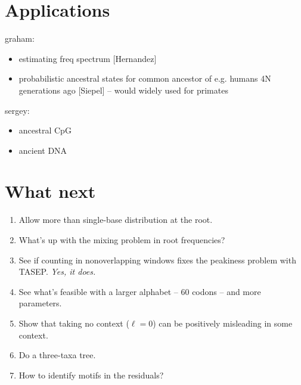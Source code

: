 \documentclass{article}
\theoremstyle{plain}
\theoremstyle{definition}
\begin{document}
\section{Applications}

graham:
\begin{itemize}

\item estimating freq spectrum [Hernandez]

\item probabilistic ancestral states for common ancestor of e.g. humans 4N generations ago [Siepel] -- would widely used for primates

\end{itemize}


sergey:
\begin{itemize}

  \item ancestral CpG

  \item ancient DNA

\end{itemize}


\section{What next}

\begin{enumerate}

  \item Allow more than single-base distribution at the root.

  \item What's up with the mixing problem in root frequencies?

  \item See if counting in nonoverlapping windows fixes the peakiness problem with TASEP. \emph{Yes, it does.}

  \item See what's feasible with a larger alphabet -- 60 codons -- and more parameters.

  \item Show that taking no context ($\ell=0$) can be positively misleading in some context.

  \item Do a three-taxa tree.

  \item How to identify motifs in the residuals?

\end{enumerate}
\end{document}
